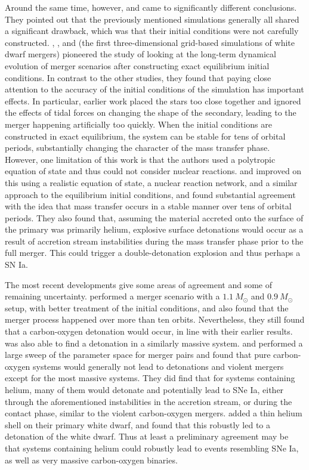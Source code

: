 \documentclass[12pt,preprint]{aastex}
\begin{document}
Around the same time, however, \cite{guillochon:2010} and \cite{dan:2011} came to significantly different conclusions. They pointed out that the previously mentioned simulations generally all shared a significant drawback, which was that their initial conditions were not carefully constructed. \cite{motl:2002}, \cite{dsouza:2006}, and \cite{motl:2007} (the first three-dimensional grid-based simulations of white dwarf mergers) pioneered the study of looking at the long-term dynamical evolution of merger scenarios after constructing exact equilibrium initial conditions. In contrast to the other studies, they found that paying close attention to the accuracy of the initial conditions of the simulation has important effects. In particular, earlier work placed the stars too close together and ignored the effects of tidal forces on changing the shape of the secondary, leading to the merger happening artificially too quickly. When the initial conditions are constructed in exact equilibrium, the system can be stable for tens of orbital periods, substantially changing the character of the mass transfer phase. However, one limitation of this work is that the authors used a polytropic equation of state and thus could not consider nuclear reactions. \cite{guillochon:2010} and \cite{dan:2011} improved on this using a realistic equation of state, a nuclear reaction network, and a similar approach to the equilibrium initial conditions, and found substantial agreement with the idea that mass transfer occurs in a stable manner over tens of orbital periods. They also found that, assuming the material accreted onto the surface of the primary was primarily helium, explosive surface detonations would occur as a result of accretion stream instabilities during the mass transfer phase prior to the full merger. This could trigger a double-detonation explosion and thus perhaps a SN Ia.

The most recent developments give some areas of agreement and some of remaining uncertainty. \cite{pakmor:2012} performed a merger scenario with a $1.1\ M_\odot$ and $0.9\ M_\odot$ setup, with better treatment of the initial conditions, and also found that the merger process happened over more than ten orbits. Nevertheless, they still found that a carbon-oxygen detonation would occur, in line with their earlier results. \cite{moll:2014} was also able to find a detonation in a similarly massive system. \cite{dan:2012} and \cite{dan:2014} performed a large sweep of the parameter space for merger pairs and found that pure carbon-oxygen systems would generally not lead to detonations and violent mergers except for the most massive systems. They did find that for systems containing helium, many of them would detonate and potentially lead to SNe Ia, either through the aforementioned instabilities in the accretion stream, or during the contact phase, similar to the violent carbon-oxygen mergers. \cite{pakmor:2013} added a thin helium shell on their primary white dwarf, and found that this robustly led to a detonation of the white dwarf. Thus at least a preliminary agreement may be that systems containing helium could robustly lead to events resembling SNe Ia, as well as very massive carbon-oxygen binaries. 
\end{document}
